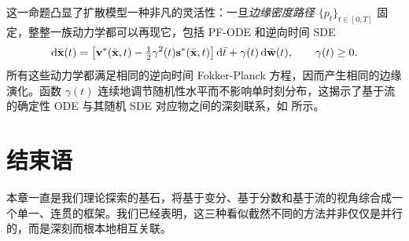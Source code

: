 这一命题凸显了扩散模型一种非凡的灵活性：一旦\emph{边缘密度路径} $\{p_t\}_{t\in[0,T]}$ 固定，整整一族动力学都可以再现它，包括 PF-ODE 和逆向时间 SDE
\[
\mathop{}\!\mathrm{d}\bar{{\mathbf{x}}}(t)
=\big[{\mathbf{v}}^*(\bar{{\mathbf{x}}},t)-\tfrac12\gamma^2(t){\mathbf{s}}^*(\bar{{\mathbf{x}}},t)\big]\mathop{}\!\mathrm{d}\bar t
+\gamma(t)\mathop{}\!\mathrm{d}\bar{{\mathbf{w}}}(t),\qquad \gamma(t)\ge0.
\]
所有这些动力学都满足相同的逆向时间 Fokker-Planck 方程，因而产生相同的边缘演化。函数 $\gamma(t)$ 连续地调节随机性水平而不影响单时刻分布，这揭示了基于流的确定性 ODE 与其随机 SDE 对应物之间的深刻联系，如  所示。


\newpage

\section{结束语}\label{subsec:takeaway-dm-gaussianfm}






本章一直是我们理论探索的基石，将基于变分、基于分数和基于流的视角综合成一个单一、连贯的框架。我们已经表明，这三种看似截然不同的方法并非仅仅是并行的，而是深刻而根本地相互关联。

